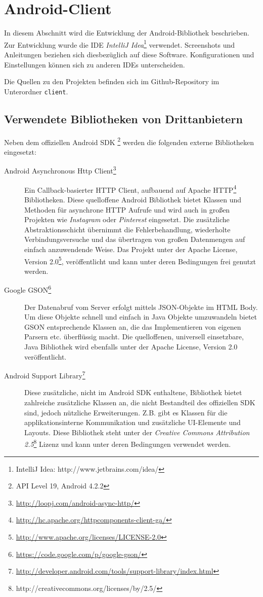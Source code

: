 \section{Android-Client}

In diesem Abschnitt wird die Entwicklung der Android-Bibliothek beschrieben. Zur Entwicklung wurde die IDE \textit{IntelliJ Idea}\footnote{IntelliJ Idea: http://www.jetbrains.com/idea/} verwendet. Screenshots und Anleitungen beziehen sich diesbezüglich auf diese Software. Konfigurationen und Einstellungen können sich zu anderen IDEs unterscheiden.

Die Quellen zu den Projekten befinden sich im Github-Repository im Unterordner \texttt{client}.

\subsection{Verwendete Bibliotheken von Drittanbietern}
Neben dem offiziellen Android SDK \footnote{API Level 19, Android 4.2.2} werden die folgenden externe Bibliotheken eingesetzt:
\begin{description}
	\item[Android Asynchronous Http Client\footnote{\url{http://loopj.com/android-async-http/}}] 
	Ein Callback-basierter HTTP Client, aufbauend auf Apache HTTP\footnote{\url{http://hc.apache.org/httpcomponents-client-ga/}} Bibliotheken. Diese quelloffene Android Bibliothek bietet Klassen und Methoden für asynchrone HTTP Aufrufe und wird auch in großen Projekten wie \emph{Instagram} oder \emph{Pinterest} eingesetzt. Die zusätzliche Abstraktionsschicht übernimmt die Fehlerbehandlung, wiederholte Verbindungsversuche und das übertragen von großen Datenmengen auf einfach anzuwendende Weise. Das Projekt unter der Apache License, Version 2.0\footnote{\url{http://www.apache.org/licenses/LICENSE-2.0}}, veröffentlicht und kann unter deren Bedingungen frei genutzt werden.
	\item[Google GSON\footnote{\url{https://code.google.com/p/google-gson/}}]
	Der Datenabruf vom Server erfolgt mittels \ac{JSON}-Objekte im HTML Body. Um diese Objekte schnell und einfach in Java Objekte umzuwandeln bietet GSON entsprechende Klassen an, die das Implementieren von eigenen Parsern etc. überflüssig macht.
	Die quelloffenen, universell einsetzbare, Java Bibliothek wird ebenfalls unter der Apache License, Version 2.0 veröffentlicht.
	\item[Android Support Library\footnote{\url{http://developer.android.com/tools/support-library/index.html}}]
	Diese zusätzliche, nicht im Android SDK enthaltene, Bibliothek bietet zahlreiche zusätzliche Klassen an, die nicht Bestandteil des offiziellen SDK sind, jedoch nützliche Erweiterungen. Z.B. gibt es Klassen für die applikationsinterne Kommunikation und zusätzliche \ac{UI}-Elemente und Layouts.
	Diese Bibliothek steht unter der \emph{Creative Commons Attribution 2.5}\footnote{http://creativecommons.org/licenses/by/2.5/} Lizenz und kann unter deren Bedingungen verwendet werden.
\end{description}

